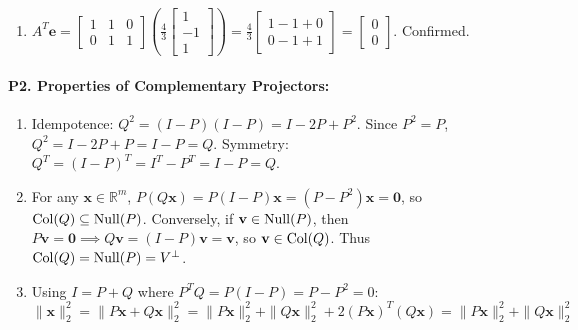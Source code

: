 \begin{enumerate}[label=(\alph*)]
    Error vector: $\mathbf{e} = \mathbf{b} - \hat{\mathbf{b}} = \begin{bmatrix} 3 - 5/3 \\ 1 - 7/3 \\ 2 - 2/3 \end{bmatrix} = \begin{bmatrix} 4/3 \\ -4/3 \\ 4/3 \end{bmatrix} = \frac{4}{3} \begin{bmatrix} 1 \\ -1 \\ 1 \end{bmatrix}$.
    \item $A^T \mathbf{e} = \begin{bmatrix} 1 & 1 & 0 \\ 0 & 1 & 1 \end{bmatrix} \left( \frac{4}{3} \begin{bmatrix} 1 \\ -1 \\ 1 \end{bmatrix} \right) = \frac{4}{3} \begin{bmatrix} 1 - 1 + 0 \\ 0 - 1 + 1 \end{bmatrix} = \begin{bmatrix} 0 \\ 0 \end{bmatrix}$. Confirmed.
\end{enumerate}

\paragraph{P2. Properties of Complementary Projectors:}
\begin{enumerate}[label=(\alph*)]
    \item Idempotence: $Q^2 = (I - P)(I - P) = I - 2P + P^2$. Since $P^2 = P$, $Q^2 = I - 2P + P = I - P = Q$.
    Symmetry: $Q^T = (I - P)^T = I^T - P^T = I - P = Q$.
    \item For any $\mathbf{x} \in \mathbb{R}^m$, $P(Q\mathbf{x}) = P(I - P)\mathbf{x} = (P - P^2)\mathbf{x} = \mathbf{0}$, so $\operatorname{Col}(Q) \subseteq \operatorname{Null}(P)$.
    Conversely, if $\mathbf{v} \in \operatorname{Null}(P)$, then $P\mathbf{v} = \mathbf{0} \implies Q\mathbf{v} = (I - P)\mathbf{v} = \mathbf{v}$, so $\mathbf{v} \in \operatorname{Col}(Q)$.
    Thus $\operatorname{Col}(Q) = \operatorname{Null}(P) = V^\perp$.
    \item Using $I = P + Q$ where $P^T Q = P(I - P) = P - P^2 = 0$:
    \begin{equation*}
    \|\mathbf{x}\|_2^2 = \|P\mathbf{x} + Q\mathbf{x}\|_2^2 = \|P\mathbf{x}\|_2^2 + \|Q\mathbf{x}\|_2^2 + 2(P\mathbf{x})^T (Q\mathbf{x}) = \|P\mathbf{x}\|_2^2 + \|Q\mathbf{x}\|_2^2
    \end{equation*}
\end{enumerate}

